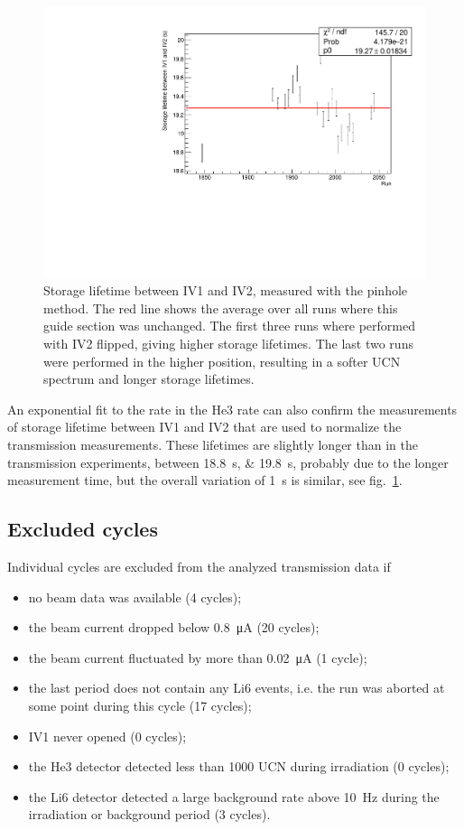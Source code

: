 \documentclass[10pt,letterpaper]{article}
\begin{document}
\begin{figure}
\centering
\includegraphics[width=\textwidth]{../storagelifetime_with_monitor/pinhole.pdf}
\caption{Storage lifetime between IV1 and IV2, measured with the pinhole method. The red line shows the average over all runs where this guide section was unchanged. The first three runs where performed with IV2 flipped, giving higher storage lifetimes. The last two runs were performed in the higher position, resulting in a softer UCN spectrum and longer storage lifetimes.}
\label{fig:pinhole}
\end{figure}

An exponential fit to the rate in the He3 rate can also confirm the measurements of storage lifetime between IV1 and IV2 that are used to normalize the transmission measurements. These lifetimes are slightly longer than in the transmission experiments, between \SIlist{18.8;19.8}{\second}, probably due to the longer measurement time, but the overall variation of \SI{1}{\second} is similar, see fig.~\ref{fig:pinhole}.

\subsection{Excluded cycles}

Individual cycles are excluded from the analyzed transmission data if
\begin{itemize}
\item no beam data was available (4 cycles);
\item the beam current dropped below \SI{0.8}{\micro\ampere} (20 cycles);
\item the beam current fluctuated by more than \SI{0.02}{\micro\ampere} (1 cycle);
\item the last period does not contain any Li6 events, i.e. the run was aborted at some point during this cycle (17 cycles);
\item IV1 never opened (0 cycles);
\item the He3 detector detected less than 1000 UCN during irradiation (0 cycles);
\item the Li6 detector detected a large background rate above \SI{10}{\hertz} during the irradiation or background period (3 cycles).
\end{itemize}
\end{document}

